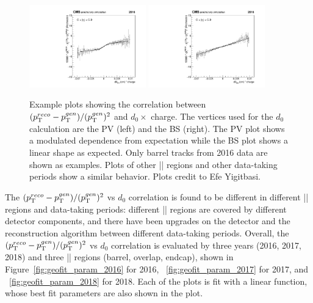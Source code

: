 \begin{figure}[!htb]
      \centering
      \includegraphics[width=0.45\textwidth]{pics/muon_corr/GeoFit/fit_results/d0_pt_PV_eg.pdf}
      \includegraphics[width=0.45\textwidth]{pics/muon_corr/GeoFit/fit_results/d0_pt_BS_eg.pdf}
      \caption{Example plots showing the correlation between $(p_{\mathrm{T}}^{reco}-p_{\mathrm{T}}^{gen})/ (p_{\mathrm{T}}^{gen})^{2}$ and $d_0 \times$ charge.
               The vertices used for the $d_0$ calculation are the PV (left) and the BS (right). 
               The PV plot shows a modulated dependence from expectation while the BS plot shows a linear shape as expected.
               Only barrel tracks from 2016 data are shown as examples. 
               Plots of other |\eta| regions and other data-taking periods show a similar behavior.
               Plots credit to Efe Yigitbasi.}
      \label{fig:pv_vs_bs_fits}
\end{figure}

The $(p_{\mathrm{T}}^{reco}-p_{\mathrm{T}}^{gen})/ (p_{\mathrm{T}}^{gen})^{2}$ vs $d_0$ correlation is found to be different in different |\eta| regions and data-taking periods: 
different |\eta| regions are covered by different detector components, and there have been upgrades on the detector and the reconstruction algorithm between different data-taking periods.
Overall, the $(p_{\mathrm{T}}^{reco}-p_{\mathrm{T}}^{gen})/ (p_{\mathrm{T}}^{gen})^{2}$ vs $d_0$ correlation is evaluated by three years (2016, 2017, 2018) and 
three |\eta| regions (barrel, overlap, endcap), shown in Figure~\ref{fig:geofit_param_2016} for 2016, ~\ref{fig:geofit_param_2017} for 2017, and ~\ref{fig:geofit_param_2018} for 2018.
Each of the plots is fit with a linear function, whose best fit parameters are also shown in the plot.

